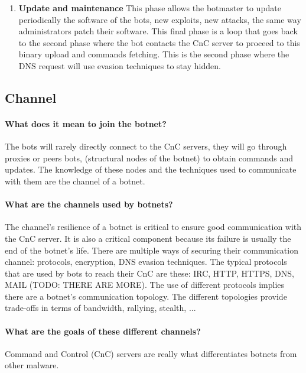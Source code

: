 \begin{enumerate}
\item \textbf{Update and maintenance}
This phase allows the botmaster to update periodically the software of the bots, new exploits, new attacks, the same way administrators patch their software. This final phase is a loop that goes back to the second phase where the bot contacts the CnC server to proceed to this binary upload and commands fetching. This is the second phase where the DNS request will use evasion techniques to stay hidden.
\end{enumerate}

\subsection{Channel}
\paragraph{What does it mean to join the botnet?} The bots will rarely directly connect to the CnC servers, they will go through proxies or peers bots, (structural nodes of the botnet) to obtain commands and updates. The knowledge of these nodes and the techniques used to communicate with them are the channel of a botnet.
\paragraph{What are the channels used by botnets?} The channel's resilience of a botnet is critical to ensure good communication with the CnC server. It is also a critical component because its failure is usually the end of the botnet's life. There are multiple ways of securing their communication channel: protocols, encryption, DNS evasion techniques.
The typical protocols that are used by bots to reach their CnC are these: IRC, HTTP, HTTPS, DNS, MAIL (TODO: THERE ARE MORE). The use of different protocols implies there are a botnet's communication topology. The different topologies provide trade-offs in terms of bandwidth, rallying, stealth, ...


\paragraph{What are the goals of these different channels?}
Command and Control (CnC) servers are really what differentiates botnets from other malware. 

